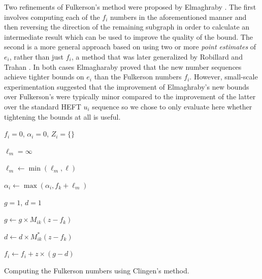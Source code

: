 \documentclass[12pt]{article}
\def\P{\mathbb{P}}
\begin{document}
Two refinements of Fulkerson's method were proposed by Elmaghraby \cite{elmaghraby67}. The first involves computing each of the $f_i$ numbers in the aforementioned manner and then reversing the direction of the remaining subgraph in order to calculate an intermediate result which can be used to improve the quality of the bound. The second is a more general approach based on using two or more {\em point estimates} of $e_i$, rather than just $f_i$, a method that was later generalized by Robillard and Trahan \cite{robillard76}. In both cases Elmagharaby proved that the new number sequences achieve tighter bounds on $e_i$ than the Fulkerson numbers $f_i$. However, small-scale experimentation suggested that the improvement of Elmaghraby's new bounds over Fulkerson's were typically minor compared to the improvement of the latter over the standard HEFT $u_i$ sequence so we chose to only evaluate here whether tightening the bounds at all is useful.

\begin{algorithm}	
	
	{	
		$f_i = 0$, $\alpha_i = 0$, $Z_i = \{\}$
		
		{
			$\ell_m = \infty$
			
			{
				$\ell_m \leftarrow \min(\ell_m, \ell)$
				
			}
			
			$\alpha_i \leftarrow \max(\alpha_i, f_k + \ell_m)$
		}
		
		
		{
			{
				$g = 1$, $d = 1$
				
				{
					$g \leftarrow g \times M_{ik}(z - f_k)$
					
					$d \leftarrow d \times M_{ik}^{*}(z - f_k)$
				}
				
				$f_i \leftarrow f_i + z \times (g - d)$				
			}
		}		
	}	
	\caption{Computing the Fulkerson numbers using Clingen's method.}
	\label{alg.fulkerson}
\end{algorithm} 


\end{document}
